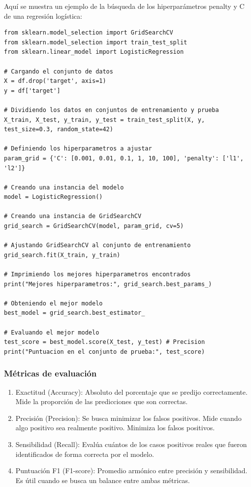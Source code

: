 \documentclass[a4paper, 12pt]{book}
\begin{document}
Aquí se muestra un ejemplo de la búsqueda de los hiperparámetros penalty y C de una regresión logística:
\begin{verbatim}
from sklearn.model_selection import GridSearchCV
from sklearn.model_selection import train_test_split
from sklearn.linear_model import LogisticRegression

# Cargando el conjunto de datos
X = df.drop('target', axis=1)
y = df['target']

# Dividiendo los datos en conjuntos de entrenamiento y prueba
X_train, X_test, y_train, y_test = train_test_split(X, y, test_size=0.3, random_state=42)

# Definiendo los hiperparametros a ajustar
param_grid = {'C': [0.001, 0.01, 0.1, 1, 10, 100], 'penalty': ['l1', 'l2']}

# Creando una instancia del modelo
model = LogisticRegression()

# Creando una instancia de GridSearchCV
grid_search = GridSearchCV(model, param_grid, cv=5)

# Ajustando GridSearchCV al conjunto de entrenamiento
grid_search.fit(X_train, y_train)

# Imprimiendo los mejores hiperparametros encontrados
print("Mejores hiperparametros:", grid_search.best_params_)

# Obteniendo el mejor modelo
best_model = grid_search.best_estimator_

# Evaluando el mejor modelo
test_score = best_model.score(X_test, y_test) # Precision
print("Puntuacion en el conjunto de prueba:", test_score)

\end{verbatim}
\subsubsection{Métricas de evaluación}
\begin{enumerate}
	\item Exactitud (Accuracy): Absoluto del porcentaje que se predijo correctamente. Mide la proporción de las predicciones que son correctas.
	\item Precisión (Precision): Se busca minimizar los falsos positivos. Mide cuando algo positivo sea realmente positivo. Minimiza los falsos positivos.
	\item Sensibilidad (Recall): Evalúa cuántos de los casos positivos reales que fueron identificados de forma correcta por el modelo.
	\item Puntuación F1 (F1-score): Promedio armónico entre precisión y sensibilidad. Es útil cuando se busca un balance entre ambas métricas.
\end{enumerate}
\end{document}
